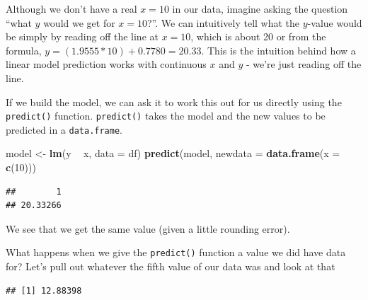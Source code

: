 \documentclass[
]{book}
\newenvironment{Shaded}{\begin{snugshade}}{\end{snugshade}}
\newcommand{\DataTypeTok}[1]{\textcolor[rgb]{0.13,0.29,0.53}{#1}}
\newcommand{\DecValTok}[1]{\textcolor[rgb]{0.00,0.00,0.81}{#1}}
\newcommand{\KeywordTok}[1]{\textcolor[rgb]{0.13,0.29,0.53}{\textbf{#1}}}
\newcommand{\NormalTok}[1]{#1}
\newcommand{\OperatorTok}[1]{\textcolor[rgb]{0.81,0.36,0.00}{\textbf{#1}}}
\newcommand{\StringTok}[1]{\textcolor[rgb]{0.31,0.60,0.02}{#1}}
\begin{document}
Although we don't have a real \(x = 10\) in our data, imagine asking the question ``what \(y\) would we get for \(x = 10\)?''. We can intuitively tell what the \(y\)-value would be simply by reading off the line at \(x = 10\), which is about 20 or from the formula, \(y = (1.9555 * 10) + 0.7780 = 20.33\). This is the intuition behind how a linear model prediction works with continuous \(x\) and \(y\) - we're just reading off the line.

If we build the model, we can ask it to work this out for us directly using the \texttt{predict()} function. \texttt{predict()} takes the model and the new values to be predicted in a \texttt{data.frame}.

\begin{Shaded}
\begin{Highlighting}[]
\NormalTok{model <-}\StringTok{ }\KeywordTok{lm}\NormalTok{(y }\OperatorTok{~}\StringTok{ }\NormalTok{x, }\DataTypeTok{data =}\NormalTok{ df)}
\KeywordTok{predict}\NormalTok{(model, }\DataTypeTok{newdata =} \KeywordTok{data.frame}\NormalTok{(}\DataTypeTok{x =} \KeywordTok{c}\NormalTok{(}\DecValTok{10}\NormalTok{)))}
\end{Highlighting}
\end{Shaded}

\begin{verbatim}
##        1 
## 20.33266
\end{verbatim}

We see that we get the same value (given a little rounding error).

What happens when we give the \texttt{predict()} function a value we did have data for? Let's pull out whatever the fifth value of our data was and look at that

\begin{Shaded}
\end{Shaded}

\begin{verbatim}
## [1] 12.88398
\end{verbatim}

\begin{Shaded}
\end{Shaded}
\end{document}
